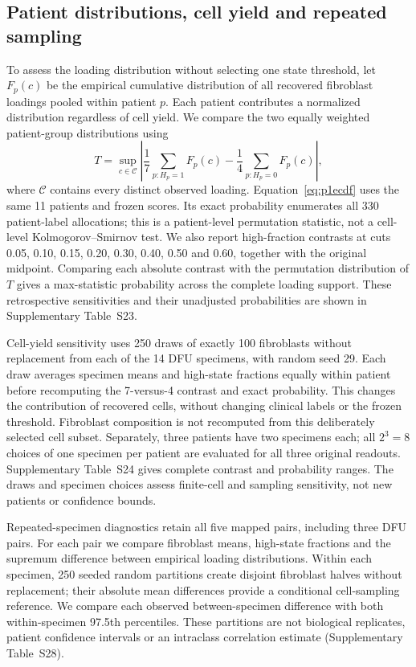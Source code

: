 \documentclass[10pt,a4paper]{article}
\begin{document}
\subsection{Patient distributions, cell yield and repeated sampling}
To assess the loading distribution without selecting one state threshold, let $F_p(c)$ be the empirical cumulative distribution of all recovered fibroblast loadings pooled within patient $p$. Each patient contributes a normalized distribution regardless of cell yield. We compare the two equally weighted patient-group distributions using
\begin{equation}
T=\sup_{c\in\mathcal C}\left|\frac1{7}\sum_{p:H_p=1}F_p(c)-\frac1{4}\sum_{p:H_p=0}F_p(c)\right|,\label{eq:p1ecdf}
\end{equation}
where $\mathcal C$ contains every distinct observed loading. Equation~\eqref{eq:p1ecdf} uses the same 11 patients and frozen scores. Its exact probability enumerates all 330 patient-label allocations; this is a patient-level permutation statistic, not a cell-level Kolmogorov--Smirnov test. We also report high-fraction contrasts at cuts 0.05, 0.10, 0.15, 0.20, 0.30, 0.40, 0.50 and 0.60, together with the original midpoint. Comparing each absolute contrast with the permutation distribution of $T$ gives a max-statistic probability across the complete loading support. These retrospective sensitivities and their unadjusted probabilities are shown in Supplementary Table~S23.

Cell-yield sensitivity uses 250 draws of exactly 100 fibroblasts without replacement from each of the 14 DFU specimens, with random seed 29. Each draw averages specimen means and high-state fractions equally within patient before recomputing the 7-versus-4 contrast and exact probability. This changes the contribution of recovered cells, without changing clinical labels or the frozen threshold. Fibroblast composition is not recomputed from this deliberately selected cell subset. Separately, three patients have two specimens each; all $2^3=8$ choices of one specimen per patient are evaluated for all three original readouts. Supplementary Table~S24 gives complete contrast and probability ranges. The draws and specimen choices assess finite-cell and sampling sensitivity, not new patients or confidence bounds.


Repeated-specimen diagnostics retain all five mapped pairs, including three DFU pairs. For each pair we compare fibroblast means, high-state fractions and the supremum difference between empirical loading distributions. Within each specimen, 250 seeded random partitions create disjoint fibroblast halves without replacement; their absolute mean differences provide a conditional cell-sampling reference. We compare each observed between-specimen difference with both within-specimen 97.5th percentiles. These partitions are not biological replicates, patient confidence intervals or an intraclass correlation estimate (Supplementary Table~S28).
\end{document}
